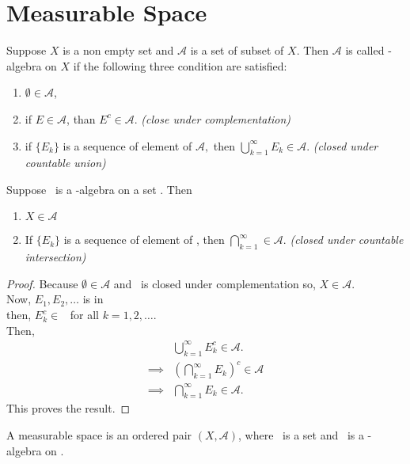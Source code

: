 \section{Measurable Space}
\begin{definition}
    Suppose $X$ is a non empty set and $\mathcal{A}$ is a set of subset of $X$. Then $\mathcal{A}$ is called  \sig-algebra
    on $X$ if the following three condition are satisfied:
    \begin{enumerate}
        \item $\emptyset\in\mathcal{A}$,
        \item if $E\in\mathcal{A}$, than $E^c\in \mathcal{A}$. \textit{(close under complementation)}
        \item if $\{E_k\}$ is a sequence of element of $\mathcal{A},$ then $\bigcup_{k=1}^\infty E_k\in\mathcal{A}$. \textit{(closed under countable union)}
    \end{enumerate}
\end{definition}
\begin{theorem}
    Suppose \A\ is a \sig-algebra on a set \XX. Then 
    \begin{enumerate}
        \item $X\in\mathcal{A}$
        \item If $\{E_k\}$ is a sequence of element of \A, then $\bigcap_{k=1}^\infty\in\mathcal{A}$. \textit{(closed under countable intersection)}
    \end{enumerate}
\end{theorem}
\begin{proof}
    Because $\emptyset \in \mathcal{A}$ and \A\ is closed under complementation so, $X\in\mathcal{A}$.\\
    Now, $E_1,E_2,\ldots$ is in \A\\ 
    then, $E_k^c\in$ \A\ for all $k=1,2,\ldots$.\\
    Then, 
    \begin{align*}
        &\bigcup_{k=1}^\infty E_k^c\in \mathcal{A}.\\
        \implies &\left(\bigcap_{k=1}^\infty E_k\right)^c \in \mathcal{A}\\
        \implies &\bigcap_{k=1}^\infty E_k\in \mathcal{A}.
    \end{align*}
    This proves the result.
\end{proof}

\begin{definition}
    A measurable space is an ordered pair  $(X,\mathcal{A})$, where \XX\ is a set and \A\ is a \sig-algebra on \XX.
\end{definition}

